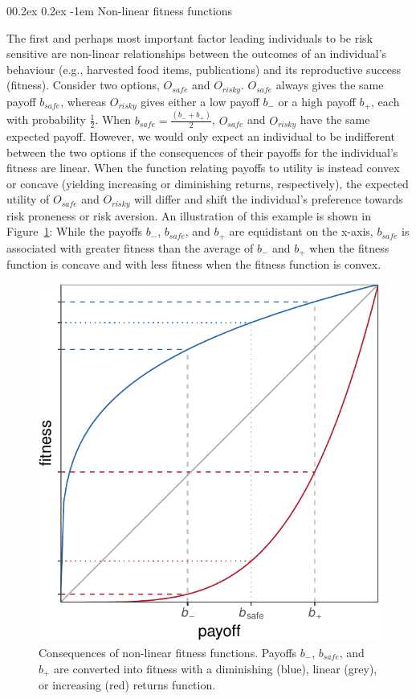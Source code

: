 \documentclass[british,,man,floatsintext]{apa6}
\makeatletter
\renewcommand{\paragraph}{\@startsection{paragraph}{4}{\parindent}%
  {0\baselineskip \@plus 0.2ex \@minus 0.2ex}%
  {-1em}%
  {\normalfont\normalsize\bfseries\itshape\typesectitle}}
\makeatother
\begin{document}
\hypertarget{non-linear-fitness-functions}{%
\paragraph{Non-linear fitness functions}\label{non-linear-fitness-functions}}

The first and perhaps most important factor leading individuals to be risk sensitive are non-linear relationships between the outcomes of an individual's behaviour (e.g., harvested food items, publications) and its reproductive success (fitness).
Consider two options, \(O_{safe}\) and \(O_{risky}\).
\(O_{safe}\) always gives the same payoff \(b_{safe}\), whereas \(O_{risky}\) gives either a low payoff \(b_-\) or a high payoff \(b_+\), each with probability \(\frac{1}{2}\).
When \(b_{safe} = \frac{(b_- + b_+)}{2}\), \(O_{safe}\) and \(O_{risky}\) have the same expected payoff.
However, we would only expect an individual to be indifferent between the two options if the consequences of their payoffs for the individual's fitness are linear.
When the function relating payoffs to utility is instead convex or concave (yielding increasing or diminishing returns, respectively), the expected utility of \(O_{safe}\) and \(O_{risky}\) will differ and shift the individual's preference towards risk proneness or risk aversion.
An illustration of this example is shown in Figure~\ref{fig:fitnessplot}:
While the payoffs \(b_-\), \(b_{safe}\), and \(b_+\) are equidistant on the x-axis, \(b_{safe}\) is associated with greater fitness than the average of \(b_-\) and \(b_+\) when the fitness function is concave and with less fitness when the fitness function is convex.



\begin{figure}
\includegraphics[width=0.5\linewidth]{rr-risk-sensitivity_files/figure-latex/fitnessplot-1} \caption{Consequences of non-linear fitness functions. Payoffs \(b_-\), \(b_{safe}\), and \(b_+\) are converted into fitness with a diminishing (blue), linear (grey), or increasing (red) returns function.}\label{fig:fitnessplot}
\end{figure}
\end{document}

